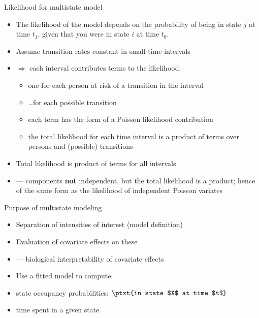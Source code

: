 \begin{frame}{Likelihood for multistate model}
  \begin{itemize}
  \item The likelihood of the model depends on the probability of being in
    state $j$ at time $t_1$, given that you were in state $i$ at time $t_0$.
  \item Assume transition rates constant in small time intervals
  \item $\Rightarrow$ each interval contributes terms to
    the likelihood:

    \begin{itemize}
    \item one for each person at risk of a transition in the interval
    \item \ldots for each possible transition
    \item each term has the form of a Poisson likelihood contribution
    \item the total likelihood for each time interval is a product of
      terms over persons and (possible) transitions
    \end{itemize}

  \item Total likelihood is product of terms for all intervals
  \item --- components \textbf{not} independent, but the total
    likelihood is a product; hence of the same form as the
    likelihood of independent Poisson variates
  \end{itemize}
\end{frame}

\begin{frame}{Purpose of multistate modeling}
  \begin{itemize}
  \item Separation of intensities of interest (model definition)
  \item Evaluation of covariate effects on these
  \item --- biological interpretability of covariate effects
  \item Use a fitted model to compute:
  \item state occupancy probabilities: $\ptxt{in state
      $X$ at time $t$}$
  \item time spent in a given state
  \end{itemize}
\end{frame}

